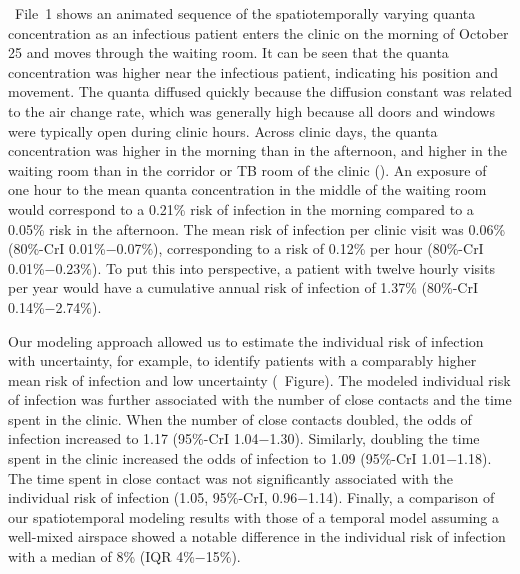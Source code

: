 \documentclass[fleqn,11pt]{wlscirep}
\begin{document}
\supp~File~1 shows an animated sequence of the spatiotemporally varying quanta concentration as an infectious patient enters the clinic on the morning of October 25 and moves through the waiting room. It can be seen that the quanta concentration was higher near the infectious patient, indicating his position and movement. The quanta diffused quickly because the diffusion constant was related to the air change rate, which was generally high because all doors and windows were typically open during clinic hours. Across clinic days, the quanta concentration was higher in the morning than in the afternoon, and higher in the waiting room than in the corridor or TB room of the clinic (). An exposure of one hour to the mean quanta concentration in the middle of the waiting room would correspond to a 0.21\% risk of infection in the morning compared to a 0.05\% risk in the afternoon. The mean risk of infection per clinic visit was 0.06\% (80\%-CrI 0.01\%$-$0.07\%), corresponding to a risk of 0.12\% per hour (80\%-CrI 0.01\%$-$0.23\%). To put this into perspective, a patient with twelve hourly visits per year would have a cumulative annual risk of infection of 1.37\% (80\%-CrI 0.14\%$-$2.74\%). 

Our modeling approach allowed us to estimate the individual risk of infection with uncertainty, for example, to identify patients with a comparably higher mean risk of infection and low uncertainty (\supp~Figure). The modeled individual risk of infection was further associated with the number of close contacts and the time spent in the clinic. When the number of close contacts doubled, the odds of infection increased to 1.17 (95\%-CrI 1.04$-$1.30). Similarly, doubling the time spent in the clinic increased the odds of infection to 1.09 (95\%-CrI 1.01$-$1.18). The time spent in close contact was not significantly associated with the individual risk of infection (1.05, 95\%-CrI, 0.96$-$1.14). Finally, a comparison of our spatiotemporal modeling results with those of a temporal model assuming a well-mixed airspace showed a notable difference in the individual risk of infection with a median of 8\% (IQR 4\%$-$15\%).  
\end{document}
